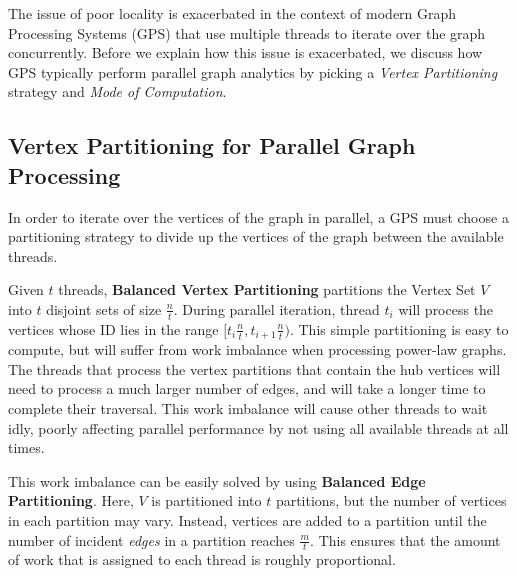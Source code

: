 The issue of poor locality is exacerbated in the context of modern Graph Processing Systems (\ac{GPS}) that use multiple threads to iterate over the graph concurrently. 
Before we explain how this issue is exacerbated, we discuss how \ac{GPS} typically perform parallel graph analytics by picking a \textit{Vertex Partitioning} strategy and \textit{Mode of Computation}. 

%


\subsection{Vertex Partitioning for Parallel Graph Processing}

In order to iterate over the vertices of the graph in parallel, a \ac{GPS} must choose a partitioning strategy to divide up the vertices of the graph between the available threads. 

Given $t$ threads, \textbf{Balanced Vertex Partitioning} partitions the Vertex Set $V$ into $t$ disjoint sets of size $\frac{n}{t}$. During parallel iteration, thread $t_i$ will process the vertices whose ID lies in the range
$[t_i \frac{n}{t},t_{i+1} \frac{n}{t})$. This simple partitioning is easy to compute, but will suffer from work imbalance when processing power-law graphs. The threads that process the vertex partitions that contain the hub vertices will need to process a much larger number of edges, and will take a longer time to complete their traversal. This work imbalance will cause other threads to wait idly, poorly affecting parallel performance by not using all available threads at all times.

This work imbalance can be easily solved by using \textbf{Balanced Edge Partitioning}. Here, $V$ is partitioned into $t$ partitions, but the number of vertices in each partition may vary. Instead, vertices are added to a partition until the number of incident \textit{edges} in a partition reaches $\frac{m}{t}$. This ensures that the amount of work that is assigned to each thread is roughly proportional. 

